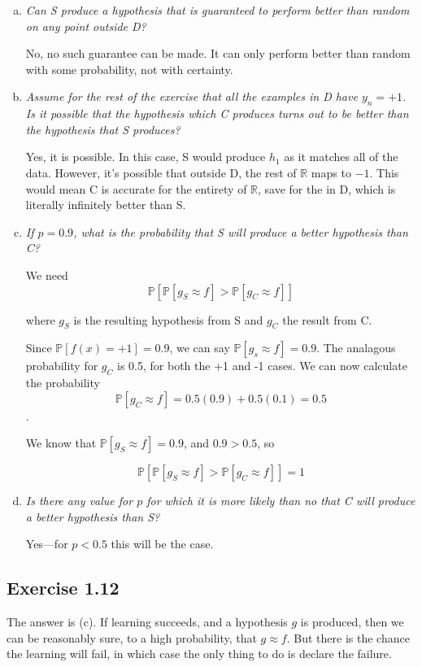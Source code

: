 \documentclass{article}
\begin{document}
\begin{enumerate}[(a)]
  \item \textit{Can S produce a hypothesis that is guaranteed to perform better than random on any point outside D?}


    No, no such guarantee can be made. It can only perform better than random with some probability, not with certainty.


  \item \textit{Assume for the rest of the exercise that all the examples in D have $y_n = +1$. Is it possible that the hypothesis which C produces turns out to be better than the hypothesis that S produces?}

    Yes, it is possible. In this case, S would produce $h_1$ as it matches all of the data. However, it's possible that outside D, the rest of $\mathbb{R}$ maps to $-1$. This would mean C is accurate for the entirety of $\mathbb{R}$, save for the in D, which is literally infinitely better than S.

  \item \textit{If $p = 0.9$, what is the probability that S will produce a better hypothesis than C?}

    We need $$\mathbb{P}[\mathbb{P}[g_S \approx f] > \mathbb{P}[g_C \approx f]]$$

    where $g_S$ is the resulting hypothesis from S and $g_C$ the result from C.

    Since $\mathbb{P}[f(x) = +1] = 0.9$, we can say $\mathbb{P}[g_s \approx f] = 0.9$.
    The analagous probability for $g_C$ is 0.5, for both the +1 and -1 cases. We can now
    calculate the probability $$\mathbb{P}[g_C \approx f] = 0.5(0.9) + 0.5(0.1) = 0.5$$.

    We know that $\mathbb{P}[g_S \approx f] = 0.9$, and $0.9 > 0.5$, so 

    $$\mathbb{P}[\mathbb{P}[g_S \approx f] > \mathbb{P}[g_C \approx f]] = 1$$


  \item \textit{Is there any value for $p$ for which it is more likely than no that C will produce a better hypothesis than S?}

    Yes---for $p < 0.5$ this will be the case.


\end{enumerate}


\subsection*{Exercise 1.12}

The answer is (c). If learning succeeds, and a hypothesis $g$ is produced, then we can be reasonably sure, to a high probability, that $g \approx f$. But there is the chance the learning will fail, in which case the only thing to do is declare the failure.
\end{document}
